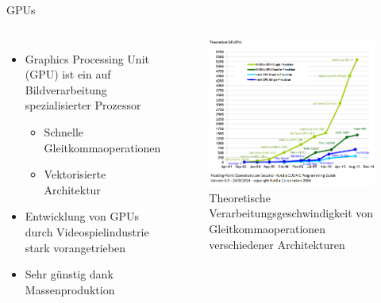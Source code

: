 \documentclass[10pt]{beamer}
\begin{document}
\begin{frame}{GPUs}
  \begin{columns}
      \begin{itemize}
        \item Graphics Processing Unit (GPU) ist ein auf Bildverarbeitung
              spezialisierter Prozessor
        \begin{itemize}
          \item Schnelle Gleitkommaoperationen
          \item Vektorisierte Architektur
        \end{itemize}
        \item Entwicklung von GPUs durch Videospielindustrie stark
              vorangetrieben
        \item Sehr günstig dank Massenproduktion
      \end{itemize}
      \begin{figure}
        \centering
        \includegraphics[width=\linewidth]{figures/fg-flops.png}
        \caption{Theoretische Verarbeitungsgeschwindigkeit von
                 Gleitkommaoperationen verschiedener
                 Architekturen\footnotemark[1]}
      \end{figure}
  \end{columns}

\end{frame}
\end{document}
